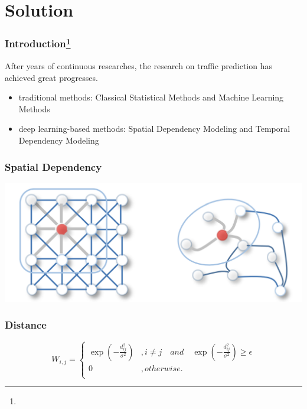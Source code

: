 \documentclass{beamer}
\begin{document}
\section{Solution}

\begin{frame}
	\frametitle{Introduction\footnote{}}
  After years of continuous researches, the research on traffic prediction has achieved great progresses.
  \begin{itemize}
    \item traditional methods: Classical Statistical Methods and Machine Learning Methods
    \item deep learning-based methods: Spatial Dependency Modeling and Temporal Dependency Modeling
  \end{itemize}
\end{frame}
\begin{frame}
	\frametitle{Spatial Dependency}
	\includegraphics[width=\textwidth]{img/convolution.png}
\end{frame}
\begin{frame}
  \frametitle{Distance}
  \begin{equation}
    W_{i,j} = \left\{
      \begin{array}{ll}
        \exp(-\frac{d^{2}_{ij}}{\sigma^{2}}) & , i \neq j \quad and \quad \exp(-\frac{d^{2}_{ij}}{\sigma^{2}}) \geq \epsilon \\
        0 & , otherwise. \\
      \end{array}\right.
    \label{eq:distance}
  \end{equation}
\end{frame}
\end{document}
